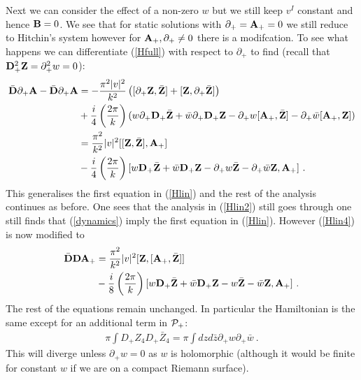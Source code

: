 \documentclass[12pt]{article}
\newcommand{\nn}{\nonumber}
\numberwithin{equation}{section}
\begin{document}
Next we can consider the effect of a non-zero $w$ but we still keep $v^I$ constant and hence ${\bf B}=0$. We see that for static solutions with $\partial_+ ={\bf A}_+=0$ we still reduce to Hitchin's system however for ${\bf A}_+,\partial_+ \ne 0$ there is a modifcation. To see what happens we can differentiate (\ref{Hfull}) with respect to $\partial_+$    to find (recall that ${\bf D}^2_+{\bf Z}=\partial_+^2w=0$):
\begin{align}
\bar {\bf D}\partial_+{\bf A} - \bar{\bf D} \partial_+{\bf A} 
&=  -\frac{\pi^2|v|^2}{k^2 }\left([{\partial}_+ {\bf Z},\bar {\bf Z}]+[{\bf Z},{\partial}_+\bar {\bf Z}]\right)\nn\\
&   + \frac{i}{4}\left(\frac{2\pi}{k}\right)(w\partial_+{\bf D}_+\bar {\bf Z}+\bar w\partial_+{\bf D}_+ {\bf Z} -   \partial_+w[{\bf A}_+,\bar{\bf Z}]  -  \partial_+{\bar w}[{\bf A}_+, {\bf Z}] )\nn\\
& =   \frac{\pi^2}{k^2}|v|^2[[{\bf Z},\bar {\bf Z}],{\bf A}_+]\nn\\
&   - \frac{i}{4}\left(\frac{2\pi}{k}\right)[w{\bf D}_+\bar {\bf Z} +{\bar w}{\bf D}_+ {\bf Z} -   \partial_+ w\bar{\bf Z}   -  \partial_+{\bar w} {\bf Z},{\bf A}_+] \ .
\end{align}
This generalises the first equation in (\ref{Hlin}) and the rest of the analysis continues as before. One sees that the analysis in (\ref{Hlin2}) still goes through one still finds that  (\ref{dynamics}) imply the first equation in (\ref{Hlin}). However (\ref{Hlin4}) is now modified to 
\begin{align} 
 \bar {\bf D} {\bf D}{\bf A}_+  &= \frac{\pi^2}{k^2}|v|^2[ {\bf Z},[{\bf A}_+,\bar {\bf Z}]]\nn\\
 &-  \frac{i}{8}\left(\frac{2\pi}{k}\right) [w{\bf D}_+\bar {\bf Z} +{\bar w}{\bf D}_+ {\bf Z} -    w\bar{\bf Z}   -  {\bar w} {\bf Z},{\bf A}_+] 
\ .
 \end{align}
The rest of the equations remain unchanged. In particular the Hamiltonian is the same except for an additional term in ${\cal P}_+$:
\begin{align}
\pi \int D_+Z_4  D_+ {\bar Z}_4  = \pi \int dzd\bar z \partial_+w\partial_+{\bar w}\ .
\end{align}
This will diverge unless $\partial_+w =  0$ as $w$ is holomorphic (although it would be finite for constant $w$ if we are on a compact Riemann surface).
\end{document}
